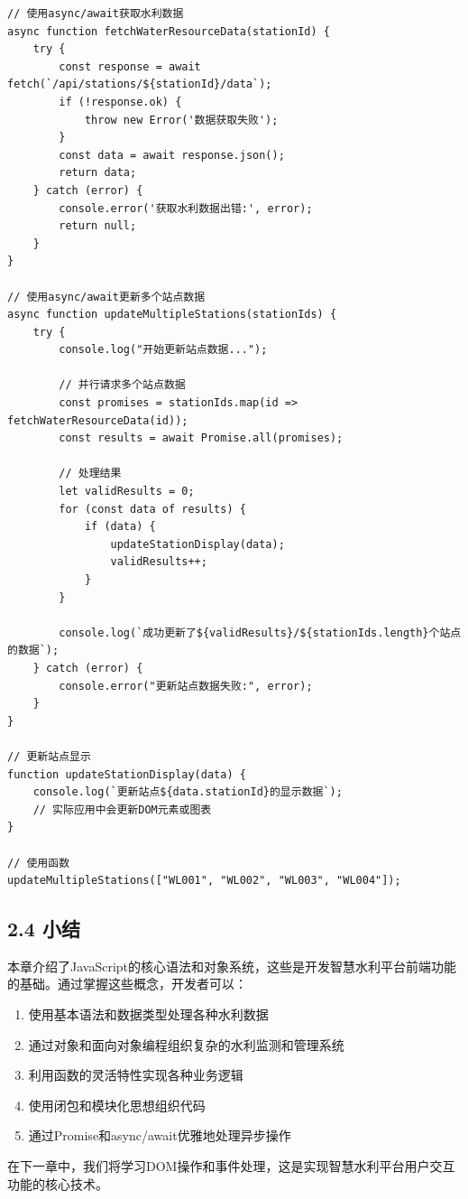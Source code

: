 \begin{lstlisting}
// 使用async/await获取水利数据
async function fetchWaterResourceData(stationId) {
    try {
        const response = await fetch(`/api/stations/${stationId}/data`);
        if (!response.ok) {
            throw new Error('数据获取失败');
        }
        const data = await response.json();
        return data;
    } catch (error) {
        console.error('获取水利数据出错:', error);
        return null;
    }
}

// 使用async/await更新多个站点数据
async function updateMultipleStations(stationIds) {
    try {
        console.log("开始更新站点数据...");
        
        // 并行请求多个站点数据
        const promises = stationIds.map(id => fetchWaterResourceData(id));
        const results = await Promise.all(promises);
        
        // 处理结果
        let validResults = 0;
        for (const data of results) {
            if (data) {
                updateStationDisplay(data);
                validResults++;
            }
        }
        
        console.log(`成功更新了${validResults}/${stationIds.length}个站点的数据`);
    } catch (error) {
        console.error("更新站点数据失败:", error);
    }
}

// 更新站点显示
function updateStationDisplay(data) {
    console.log(`更新站点${data.stationId}的显示数据`);
    // 实际应用中会更新DOM元素或图表
}

// 使用函数
updateMultipleStations(["WL001", "WL002", "WL003", "WL004"]);
\end{lstlisting}

\subsection{2.4 小结}\label{ux5c0fux7ed3}

本章介绍了JavaScript的核心语法和对象系统，这些是开发智慧水利平台前端功能的基础。通过掌握这些概念，开发者可以：

\begin{enumerate}
\def\labelenumi{\arabic{enumi}.}
\tightlist
\item
  使用基本语法和数据类型处理各种水利数据
\item
  通过对象和面向对象编程组织复杂的水利监测和管理系统
\item
  利用函数的灵活特性实现各种业务逻辑
\item
  使用闭包和模块化思想组织代码
\item
  通过Promise和async/await优雅地处理异步操作
\end{enumerate}

在下一章中，我们将学习DOM操作和事件处理，这是实现智慧水利平台用户交互功能的核心技术。
